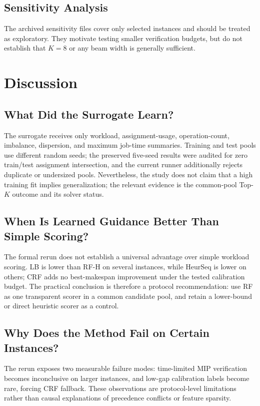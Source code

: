 \documentclass[12pt]{article}
\begin{document}
\subsection{Sensitivity Analysis}
The archived sensitivity files cover only selected instances and should be treated as exploratory. They motivate testing smaller verification budgets, but do not establish that $K=8$ or any beam width is generally sufficient.

\section{Discussion}

\subsection{What Did the Surrogate Learn?}
The surrogate receives only workload, assignment-usage, operation-count, imbalance, dispersion, and maximum job-time summaries. Training and test pools use different random seeds; the preserved five-seed results were audited for zero train/test assignment intersection, and the current runner additionally rejects duplicate or undersized pools. Nevertheless, the study does not claim that a high training fit implies generalization; the relevant evidence is the common-pool Top-$K$ outcome and its solver status.

\subsection{When Is Learned Guidance Better Than Simple Scoring?}
The formal rerun does not establish a universal advantage over simple workload scoring. LB is lower than RF-H on several instances, while HeurSeq is lower on others; CRF adds no best-makespan improvement under the tested calibration budget. The practical conclusion is therefore a protocol recommendation: use RF as one transparent scorer in a common candidate pool, and retain a lower-bound or direct heuristic scorer as a control.

\subsection{Why Does the Method Fail on Certain Instances?}
The rerun exposes two measurable failure modes: time-limited MIP verification becomes inconclusive on larger instances, and low-gap calibration labels become rare, forcing CRF fallback. These observations are protocol-level limitations rather than causal explanations of precedence conflicts or feature sparsity.
\end{document}
